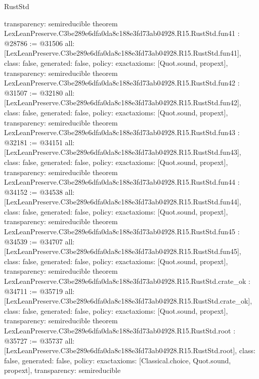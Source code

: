 \begin{lexlean}{RustStd}
\begin{coremodule}
{  transparency: semireducible
}
theorem LexLeanPreserve.C3be289e6dfa0da8c188e3fd73ab04928.R15.RustStd.fun41 : @28786 := @31506 {
  all: [LexLeanPreserve.C3be289e6dfa0da8c188e3fd73ab04928.R15.RustStd.fun41],
  class: false,
  generated: false,
  policy: exact{axioms: [Quot.sound, propext]},
  transparency: semireducible
}
theorem LexLeanPreserve.C3be289e6dfa0da8c188e3fd73ab04928.R15.RustStd.fun42 : @31507 := @32180 {
  all: [LexLeanPreserve.C3be289e6dfa0da8c188e3fd73ab04928.R15.RustStd.fun42],
  class: false,
  generated: false,
  policy: exact{axioms: [Quot.sound, propext]},
  transparency: semireducible
}
theorem LexLeanPreserve.C3be289e6dfa0da8c188e3fd73ab04928.R15.RustStd.fun43 : @32181 := @34151 {
  all: [LexLeanPreserve.C3be289e6dfa0da8c188e3fd73ab04928.R15.RustStd.fun43],
  class: false,
  generated: false,
  policy: exact{axioms: [Quot.sound, propext]},
  transparency: semireducible
}
theorem LexLeanPreserve.C3be289e6dfa0da8c188e3fd73ab04928.R15.RustStd.fun44 : @34152 := @34538 {
  all: [LexLeanPreserve.C3be289e6dfa0da8c188e3fd73ab04928.R15.RustStd.fun44],
  class: false,
  generated: false,
  policy: exact{axioms: [Quot.sound, propext]},
  transparency: semireducible
}
theorem LexLeanPreserve.C3be289e6dfa0da8c188e3fd73ab04928.R15.RustStd.fun45 : @34539 := @34707 {
  all: [LexLeanPreserve.C3be289e6dfa0da8c188e3fd73ab04928.R15.RustStd.fun45],
  class: false,
  generated: false,
  policy: exact{axioms: [Quot.sound, propext]},
  transparency: semireducible
}
theorem LexLeanPreserve.C3be289e6dfa0da8c188e3fd73ab04928.R15.RustStd.crate_ok : @34711 := @35719 {
  all: [LexLeanPreserve.C3be289e6dfa0da8c188e3fd73ab04928.R15.RustStd.crate_ok],
  class: false,
  generated: false,
  policy: exact{axioms: [Quot.sound, propext]},
  transparency: semireducible
}
theorem LexLeanPreserve.C3be289e6dfa0da8c188e3fd73ab04928.R15.RustStd.root : @35727 := @35737 {
  all: [LexLeanPreserve.C3be289e6dfa0da8c188e3fd73ab04928.R15.RustStd.root],
  class: false,
  generated: false,
  policy: exact{axioms: [Classical.choice, Quot.sound, propext]},
  transparency: semireducible
}


\end{coremodule}
\end{lexlean}
